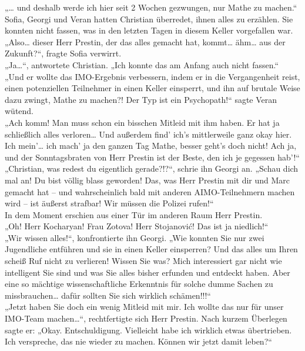 \documentclass[oneside]{memoir}
\begin{document}
\noindent „\ldots{} und deshalb werde ich hier seit 2 Wochen gezwungen, nur Mathe zu machen.“ \\
Sofia, Georgi und Veran hatten Christian überredet, ihnen alles zu erzählen. Sie konnten nicht fassen, was in den letzten Tagen in diesem Keller vorgefallen war. \\
„Also\ldots{} dieser Herr Prestin, der das alles gemacht hat, kommt\ldots{} ähm\ldots{} aus der Zukunft?“, fragte Sofia verwirrt. \\
„Ja\ldots“, antwortete Christian. „Ich konnte das am Anfang auch nicht fassen.“ \\
„Und er wollte das IMO-Ergebnis verbessern, indem er in die Vergangenheit reist, einen potenziellen Teilnehmer in einen Keller einsperrt, und ihn auf brutale Weise dazu zwingt, Mathe zu machen?! Der Typ ist ein Psychopath!“ sagte Veran wütend. \\
„Ach komm! Man muss schon ein bisschen Mitleid mit ihm haben. Er hat ja schließlich alles verloren\ldots{} Und außerdem find' ich's mittlerweile ganz okay hier. Ich mein'\ldots{} ich mach' ja den ganzen Tag Mathe, besser geht’s doch nicht!
Ach ja, und der Sonntagsbraten von Herr Prestin ist der Beste, den ich je gegessen hab'!“ \\
„Christian, was redest du eigentlich gerade?!?“, schrie ihn Georgi an. „Schau dich mal an! Du bist völlig blass geworden! Das, was Herr Prestin mit dir und Marc gemacht hat -- und wahrscheinlich bald mit anderen AIMO-Teilnehmern machen wird -- ist äußerst strafbar! Wir müssen die Polizei rufen!“ \\
In dem Moment erschien aus einer Tür im anderen Raum Herr Prestin. \\
„Oh! Herr Kocharyan! Frau Zotova! Herr Stojanović! Das ist ja niedlich!“ \\
„Wir wissen alles!“, konfrontierte ihn Georgi. „Wie konnten Sie nur zwei Jugendliche entführen und sie in einen Keller einsperren? Und das alles um Ihren scheiß Ruf nicht zu verlieren! Wissen Sie was? Mich interessiert gar nicht wie intelligent Sie sind und was Sie alles bisher erfunden und entdeckt haben. Aber eine so mächtige wissenschaftliche Erkenntnis für solche dumme Sachen zu missbrauchen\ldots{} dafür sollten Sie sich wirklich schämen!!!“ \\
„Jetzt haben Sie doch ein wenig Mitleid mit mir. Ich wollte das nur für unser IMO-Team machen\ldots“, rechtfertigte sich Herr Prestin. Nach kurzem Überlegen sagte er: „Okay. Entschuldigung. Vielleicht habe ich wirklich etwas übertrieben. Ich verspreche, das nie wieder zu machen. Können wir jetzt damit leben?“ \\
\end{document}
